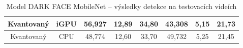\begin{table}[H]
\begin{tabular}{cc|ccc|ccc|}
  \multicolumn{1}{|c|}{\cellcolor[HTML]{E0DBDB}Kvantovaný}     & \cellcolor[HTML]{E0DBDB}iGPU & \multicolumn{1}{c|}{56,927}                                 & \multicolumn{1}{c|}{12,89}                                  & 34,80          & \multicolumn{1}{c|}{43,308}                                 & \multicolumn{1}{c|}{5,15}                                   & 21,73          \\ \hline
  \multicolumn{1}{|c|}{\cellcolor[HTML]{E0DBDB}Kvantovaný}     & \cellcolor[HTML]{E0DBDB}CPU  & \multicolumn{1}{c|}{48,774}                                 & \multicolumn{1}{c|}{12,60}                                  & 33,70          & \multicolumn{1}{c|}{49,732}                                 & \multicolumn{1}{c|}{5,25}                                   & 21,45          \\ \hline
  \end{tabular}
  \label{tabulka:dfmvidea}
  \caption{Model DARK FACE MobileNet -- výsledky detekce na testovacích videích}
\end{table}


